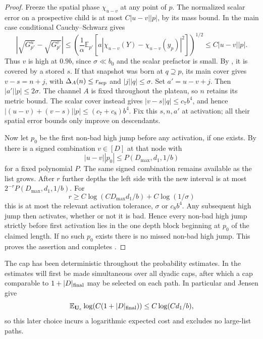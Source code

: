 \begin{proof}
Freeze the spatial phase $\chi_{u-v}$ at any point of $p$. The normalized
scalar error on a prospective child is at most $C|u-v||p|$, by its mass
bound. In the main case conditional Cauchy--Schwarz gives
\[
 \left|\sqrt{G_{p'}^u}-\sqrt{G_{p'}^v}\right|
 \le\left(\frac1\alpha\mathbb E_{p'}
       [a|\chi_{u-v}(Y)-\chi_{u-v}(y_p)|^2]\right)^{1/2}
 \le C|u-v||p|.
\]
Thus $v$ is high at $0.9b$, since $\sigma\ll b_0$ and the scalar
prefactor is small. By , it is covered by a stored
$s$. If that snapshot was born at $q\supseteq p$, its main cover gives
$v-s=n+j$, with $\Delta_A(n)\le r_{\rm sep}$ and $|j||q|\le\sigma$.
Set $a'=u-v+j$. Then $|a'||p|\le2\sigma$. The channel $A$ is fixed
throughout the plateau, so $n$ retains its metric bound. The scalar cover
instead gives $|v-s||q|\le c_7b^4$, and hence
$|(u-v)+(v-s)||p|\le(c_7+c_8)b^4$. Fix this $s,n,a'$ at activation;
all their spatial error bounds only improve on descendants.

Now let $p_0$ be the first non-bad high jump before any activation, if one
exists. By  there is a signed combination $v\in[D]$ at
that node with
\[
 |u-v||p_0|\le P(D_{\max},d_1,1/b)
\]
for a fixed polynomial $P$. The same signed combination remains available
as the list grows. After $r$ further depths the left side with the new
interval is at most $2^{-r}P(D_{\max},d_1,1/b)$. For
\[
 r\ge C\log(CD_{\max}d_1/b)+C\log(1/\sigma)
\]
this is at most the relevant activation tolerance, $\sigma$ or $c_8b^4$.
Any subsequent high jump then activates, whether or not it is bad. Hence
every non-bad high jump strictly before first activation lies in the one
depth block beginning at $p_0$ of the claimed length. If no such $p_0$
exists there is no missed non-bad high jump. This proves the assertion and
completes .
\end{proof}

The cap has been deterministic throughout the probability estimates. In
 the estimates will first be made simultaneous over all
dyadic caps, after which a cap comparable to $1+|D|_{\rm final}$ may be
selected on each path. In particular  and Jensen
give
\[
 \mathbb E_{\mathbf U_e}\log(C(1+|D|_{\rm final}))
       \le C\log(Cd_1/b),
\]
so this later choice incurs a logarithmic expected cost and excludes no
large-list paths.
